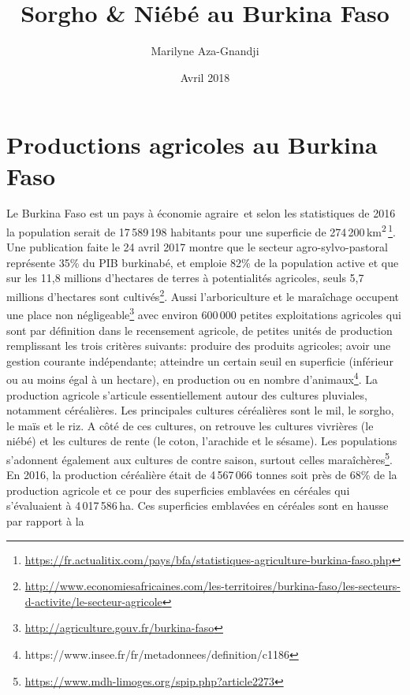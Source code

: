 \documentclass[a4paper,11pt]{article}
\begin{document}
\title{Sorgho \& Niébé au Burkina Faso}
\author{Marilyne Aza-Gnandji}
\date{Avril 2018} 

\maketitle
\tableofcontents

\section{Productions agricoles au Burkina Faso}

Le Burkina Faso est un pays à économie
agraire\,\cite{Koulibi_FideleZONGO} et selon les statistiques de 2016
la population serait de 17\,589\,198 habitants pour une superficie de
274\,200\,km\textsuperscript{2}\,\footnote{\url{https://fr.actualitix.com/pays/bfa/statistiques-agriculture-burkina-faso.php}}. Une
publication faite le 24 avril 2017 montre que le secteur
agro-sylvo-pastoral représente 35\% du PIB burkinabé, et emploie 82\%
de la population active et que sur les 11,8 millions d'hectares de
terres à potentialités agricoles, seuls 5,7 millions d’hectares sont
cultivés\footnote{\url{http://www.economiesafricaines.com/les-territoires/burkina-faso/les-secteurs-d-activite/le-secteur-agricole}}. Aussi
l'arboriculture et le maraîchage occupent une place non
négligeable\footnote{\url{http://agriculture.gouv.fr/burkina-faso}}
avec environ 600\,000 petites exploitations agricoles qui sont par
définition dans le recensement agricole, de petites unités de
production remplissant les trois critères suivants: produire des
produits agricoles; avoir une gestion courante indépendante; atteindre
un certain seuil en superficie (inférieur ou au moins égal à un
hectare), en production ou en nombre
d’animaux\footnote{https://www.insee.fr/fr/metadonnees/definition/c1186}. La
production agricole s’articule essentiellement autour des cultures
pluviales, notamment céréalières. Les principales cultures céréalières
sont le mil, le sorgho, le maïs et le riz. A côté de ces cultures, on
retrouve les cultures vivrières (le niébé) et les cultures de rente
(le coton, l’arachide et le sésame). Les populations s’adonnent
également aux cultures de contre saison, surtout celles
maraîchères\footnote{\url{https://www.mdh-limoges.org/spip.php?article2273}}.
En 2016, la production céréalière était de 4\,567\,066 tonnes soit
près de 68\% de la production agricole et ce pour des superficies
emblavées en céréales qui s'évaluaient à 4\,017\,586\,ha. Ces
superficies emblavées en céréales sont en hausse par rapport à la
\end{document}
